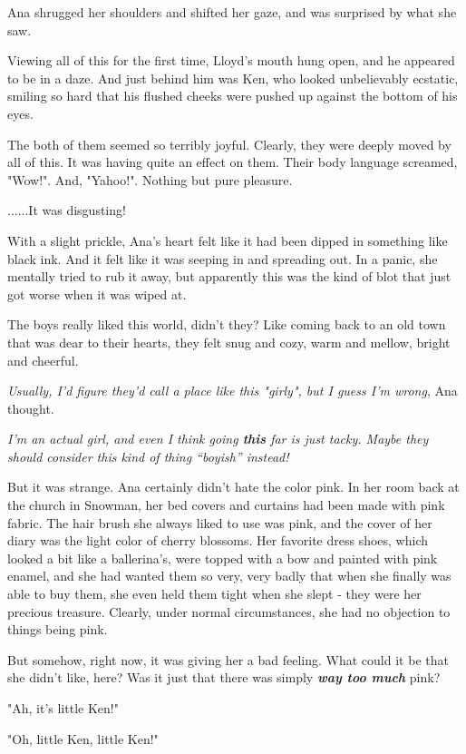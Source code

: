 \documentclass[
]{article}
\begin{document}
Ana shrugged her shoulders and shifted her gaze, and was surprised by
what she saw.

Viewing all of this for the first time, Lloyd's mouth hung open, and he
appeared to be in a daze. And just behind him was Ken, who looked
unbelievably ecstatic, smiling so hard that his flushed cheeks were
pushed up against the bottom of his eyes.

The both of them seemed so terribly joyful. Clearly, they were deeply
moved by all of this. It was having quite an effect on them. Their body
language screamed, "Wow!". And, "Yahoo!". Nothing but pure pleasure.

......It was disgusting!

With a slight prickle, Ana's heart felt like it had been dipped in
something like black ink. And it felt like it was seeping in and
spreading out. In a panic, she mentally tried to rub it away, but
apparently this was the kind of blot that just got worse when it was
wiped at.

The boys really liked this world, didn't they? Like coming back to an
old town that was dear to their hearts, they felt snug and cozy, warm
and mellow, bright and cheerful.

\emph{Usually, I'd figure they'd call a place like this "girly", but I
guess I'm wrong}, Ana thought.

\emph{I'm an actual girl, and even I think going \textbf{this} far is
just tacky. Maybe they should consider this kind of thing ``boyish''
instead!}

But it was strange. Ana certainly didn't hate the color pink. In her
room back at the church in Snowman, her bed covers and curtains had been
made with pink fabric. The hair brush she always liked to use was pink,
and the cover of her diary was the light color of cherry blossoms. Her
favorite dress shoes, which looked a bit like a ballerina's, were topped
with a bow and painted with pink enamel, and she had wanted them so
very, very badly that when she finally was able to buy them, she even
held them tight when she slept - they were her precious treasure.
Clearly, under normal circumstances, she had no objection to things
being pink.

But somehow, right now, it was giving her a bad feeling. What could it
be that she didn't like, here? Was it just that there was simply
\emph{\textbf{way too much}} pink?

"Ah, it's little Ken!"

"Oh, little Ken, little Ken!"
\end{document}
